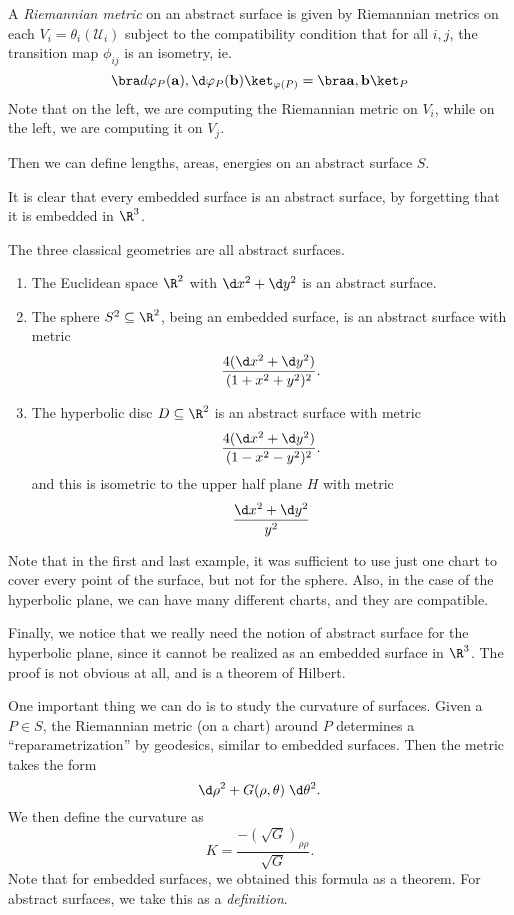\documentclass[a4paper]{article}
\begin{document}
\begin{defi}
  A \emph{Riemannian metric} on an abstract surface is given by Riemannian metrics on each $V_i = \theta_i(\mathcal{U}_i)$ subject to the compatibility condition that for all $i, j$, the transition map $\phi_{ij}$ is an isometry, ie.
  \[
    \bra d \varphi_P(\mathbf{a}), \d \varphi_P(\mathbf{b})\ket_{\varphi(P)} = \bra \mathbf{a}, \mathbf{b}\ket_P
  \]
  Note that on the left, we are computing the Riemannian metric on $V_i$, while on the left, we are computing it on $V_j$.
\end{defi}

Then we can define lengths, areas, energies on an abstract surface $S$.

It is clear that every embedded surface is an abstract surface, by forgetting that it is embedded in $\R^3$.
\begin{eg}
  The three classical geometries are all abstract surfaces.
  \begin{enumerate}
    \item The Euclidean space $\R^2$ with $\d x^2 + \d y^2$ is an abstract surface.
    \item The sphere $S^2 \subseteq \R^2$, being an embedded surface, is an abstract surface with metric
      \[
        \frac{4(\d x^2 + \d y^2)}{(1 + x^2 + y^2)^2}.
      \]
    \item The hyperbolic disc $D \subseteq \R^2$ is an abstract surface with metric
      \[
        \frac{4(\d x^2 + \d y^2)}{(1 - x^2 - y^2)^2}.
      \]
      and this is isometric to the upper half plane $H$ with metric
      \[
        \frac{\d x^2 + \d y^2}{y^2}
      \]
  \end{enumerate}
\end{eg}
Note that in the first and last example, it was sufficient to use just one chart to cover every point of the surface, but not for the sphere. Also, in the case of the hyperbolic plane, we can have many different charts, and they are compatible.

Finally, we notice that we really need the notion of abstract surface for the hyperbolic plane, since it cannot be realized as an embedded surface in $\R^3$. The proof is not obvious at all, and is a theorem of Hilbert.

One important thing we can do is to study the curvature of surfaces. Given a $P \in S$, the Riemannian metric (on a chart) around $P$ determines a ``reparametrization'' by geodesics, similar to embedded surfaces. Then the metric takes the form
\[
  \d \rho^2 + G(\rho, \theta) \;\d \theta^2.
\]
We then define the curvature as
\[
  K = \frac{-(\sqrt{G})_{\rho\rho}}{\sqrt{G}}.
\]
Note that for embedded surfaces, we obtained this formula as a theorem. For abstract surfaces, we take this as a \emph{definition}.
\end{document}
